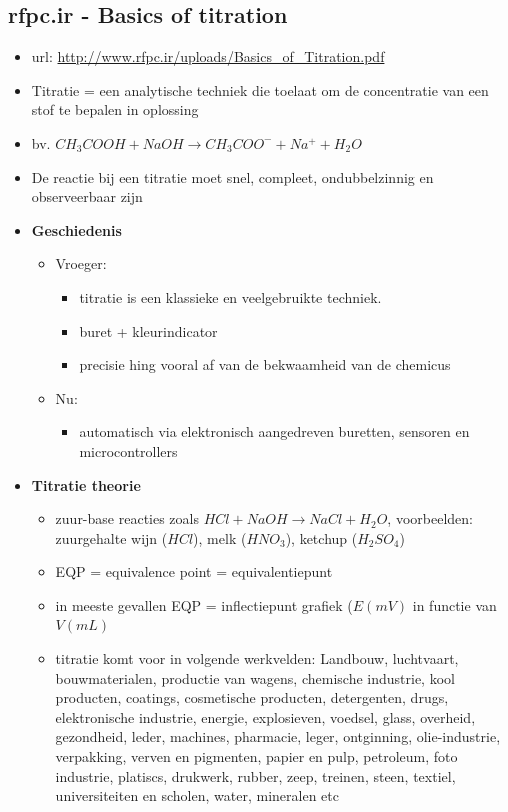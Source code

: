 \documentclass[10pt]{report}
\begin{document}
\subsection{rfpc.ir - Basics of titration}
\begin{itemize}
    \item url: \url{http://www.rfpc.ir/uploads/Basics_of_Titration.pdf}
\end{itemize}
\begin{itemize}
    \item Titratie = een analytische techniek die toelaat om de concentratie van een stof te bepalen in oplossing
    \item bv. $CH_3COOH + NaOH \rightarrow CH_3COO^- + Na^+ + H_2O$
    \item De reactie bij een titratie moet snel, compleet, ondubbelzinnig en observeerbaar zijn
    \item \textbf{Geschiedenis}
        \begin{itemize}
            \item Vroeger:
            \begin{itemize}
                \item titratie is een klassieke en veelgebruikte techniek.
                \item buret + kleurindicator
                \item precisie hing vooral af van de bekwaamheid van de chemicus
            \end{itemize}
            \item Nu:
            \begin{itemize}
                \item automatisch via elektronisch aangedreven buretten, sensoren en microcontrollers
            \end{itemize}
        \end{itemize}
    \item \textbf{Titratie theorie}
        \begin{itemize}
            \item zuur-base reacties zoals $HCl + NaOH \rightarrow NaCl + H_2O$, voorbeelden: zuurgehalte wijn ($HCl$), melk ($HNO_3$), ketchup ($H_2SO_4$)
            \item EQP = equivalence point = equivalentiepunt
            \item in meeste gevallen EQP = inflectiepunt grafiek ($E (mV)$ in functie van $V (mL)$
            \item titratie komt voor in volgende werkvelden: Landbouw, luchtvaart, bouwmaterialen, productie van wagens, chemische industrie, kool producten, coatings, cosmetische producten, detergenten, drugs, elektronische industrie, energie, explosieven, voedsel, glass, overheid, gezondheid, leder, machines, pharmacie, leger, ontginning, olie-industrie, verpakking, verven en pigmenten, papier en pulp, petroleum, foto industrie, platiscs, drukwerk, rubber, zeep, treinen, steen, textiel, universiteiten en scholen, water, mineralen etc

\end{itemize}
\end{itemize}
\end{document}
